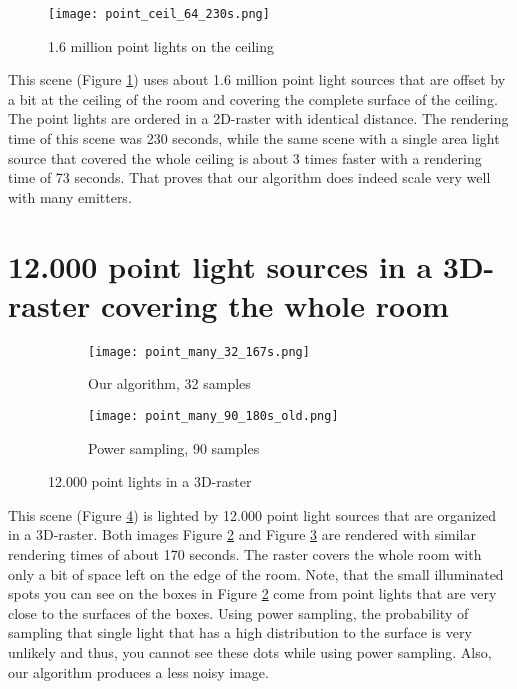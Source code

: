 \begin{figure}
	\begin{center}
		\texttt{[image: point\_ceil\_64\_230s.png]}
		\caption{1.6 million point lights on the ceiling}
		\label{fig:many}
	\end{center}
\end{figure}

This scene (Figure \ref{fig:many}) uses about 1.6 million point light sources that are offset by a bit at the ceiling of the room and covering the complete surface of the ceiling. The point lights are ordered in a 2D-raster with identical distance. The rendering time of this scene was 230 seconds, while the same scene with a single area light source that covered the whole ceiling
is about 3 times faster with a rendering time of 73 seconds. That proves that our algorithm does indeed scale very well with many emitters.

\section{12.000 point light sources in a 3D-raster covering the whole room}

\begin{figure}
	\centering
	\begin{subfigure}{.5\textwidth}
		\centering
		\texttt{[image: point\_many\_32\_167s.png]}
		\caption{Our algorithm, 32 samples}
		\label{fig:point1}
	\end{subfigure}%
	\begin{subfigure}{.5\textwidth}
		\centering
		\texttt{[image: point\_many\_90\_180s\_old.png]}
		\caption{Power sampling, 90 samples}
		\label{fig:point2}
	\end{subfigure}
	\caption{12.000 point lights in a 3D-raster}
	\label{pointl}
\end{figure}

This scene (Figure \ref{pointl}) is lighted by 12.000 point light sources that are organized in a 3D-raster. Both images Figure \ref{fig:point1} and Figure \ref{fig:point2} are rendered with similar rendering times of about 170 seconds. The raster covers the whole room with only a bit of space left on the edge of the room. Note, that the small illuminated spots you can see on the boxes in Figure \ref{fig:point1} come from point lights that are very close to the surfaces of the boxes. Using power sampling, the probability of sampling that single light that has a high distribution to the surface is very unlikely and thus, you cannot see these dots while using power sampling. Also, our algorithm produces a less noisy image.

